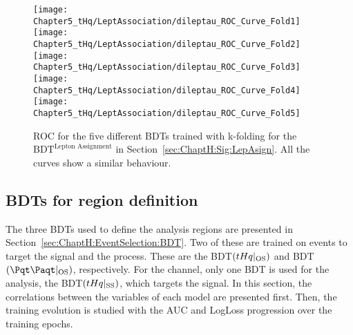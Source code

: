 \begin{figure}[h]
\centering
\texttt{[image: Chapter5\_tHq/LeptAssociation/dileptau\_ROC\_Curve\_Fold1]}\quad
\texttt{[image: Chapter5\_tHq/LeptAssociation/dileptau\_ROC\_Curve\_Fold2]}\quad
\texttt{[image: Chapter5\_tHq/LeptAssociation/dileptau\_ROC\_Curve\_Fold3]}
\medskip
\texttt{[image: Chapter5\_tHq/LeptAssociation/dileptau\_ROC\_Curve\_Fold4]}\quad
\texttt{[image: Chapter5\_tHq/LeptAssociation/dileptau\_ROC\_Curve\_Fold5]}
\caption{ROC for the five different BDTs trained with k-folding for the $\text{BDT}^{\text{Lepton Assignment}}$ in Section~\ref{sec:ChaptH:Sig:LepAsign}.
All the curves show a similar behaviour.}
\label{fig:dileptau:Assignment_appendix:ROCs}
\end{figure}





\subsection{BDTs for region definition}
\label{sec:BDT:AdditionalMaterial:Region}
The three BDTs used to define the analysis regions are presented in 
Section~\ref{sec:ChaptH:EventSelection:BDT}. Two of these are
trained on \dilepOStau events to target the signal and the \ttbar 
process. These are the BDT$(tHq|_{\text{OS}})$ and BDT$(\ttbar|_{\text{OS}})$,
respectively. For the \dilepSStau channel, only one BDT is used for the analysis,
the BDT$(tHq|_{\text{SS}})$, which targets the signal.  In this section, 
the correlations between the variables of each model are presented first.
Then, the training evolution is studied with the AUC and LogLoss progression
over the training epochs.

